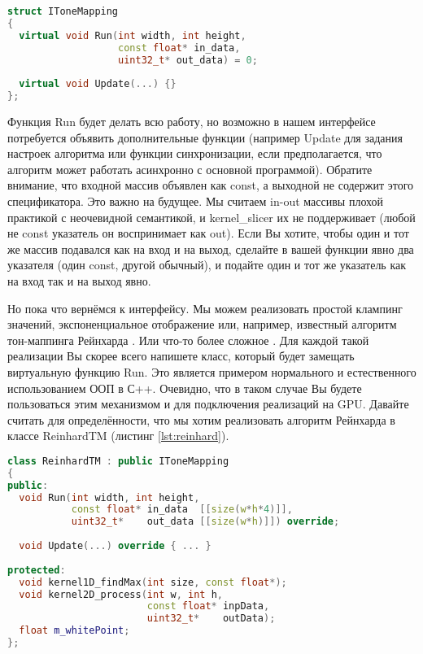 \documentclass[11pt,fleqn,english,russian]{report} %
\begin{document}
\begin{lstlisting}[language=C++, caption=интерфейс алгоритмов тон-маппинга]
struct IToneMapping
{
  virtual void Run(int width, int height, 
                   const float* in_data,
                   uint32_t* out_data) = 0;
                   
  virtual void Update(...) {}                 
};
\end{lstlisting}\label{lst:tonemapping_api2}

Функция Run будет делать всю работу, но возможно в нашем интерфейсе потребуется объявить дополнительные функции (например Update для задания настроек алгоритма или функции синхронизации, если предполагается, что алгоритм может работать асинхронно с основной программой). Обратите внимание, что входной массив объявлен как const, а выходной не содержит этого спецификатора. Это важно на будущее. Мы считаем in-out массивы плохой практикой с неочевидной семантикой, и kernel\_slicer их не поддерживает (любой не const указатель он воспринимает как out). Если Вы хотите, чтобы один и тот же массив подавался как на вход и на выход, сделайте в вашей функции явно два указателя (один const, другой обычный), и подайте один и тот же указатель как на вход так и на выход явно.  

Но пока что вернёмся к интерфейсу. Мы можем реализовать простой клампинг значений, экспоненциальное отображение или, например, известный алгоритм тон-маппинга Рейнхарда \cite{Reinhard05}. Или что-то более сложное \cite{Mantiuk08}. Для каждой такой реализации Вы скорее всего напишете класс, который будет замещать виртуальную функцию Run. Это является примером нормального и естественного использованием ООП в С++. Очевидно, что в таком случае Вы будете пользоваться этим механизмом и для подключения реализаций на GPU. Давайте считать для определённости, что мы хотим реализовать алгоритм Рейнхарда в классе ReinhardTM (листинг \ref{lst:reinhard}).

\begin{lstlisting}[language=C++, 
	               caption=класс для алгоритма Рейнхарда, 
	               label=lst:reinhard]	
class ReinhardTM : public IToneMapping
{
public:
  void Run(int width, int height, 
           const float* in_data  [[size(w*h*4)]], 
           uint32_t*    out_data [[size(w*h)]]) override;
		   
  void Update(...) override { ... }
   	
protected:
  void kernel1D_findMax(int size, const float*);
  void kernel2D_process(int w, int h, 
                        const float* inpData, 
                        uint32_t*    outData);
  float m_whitePoint;
};
\end{lstlisting}
\end{document}
